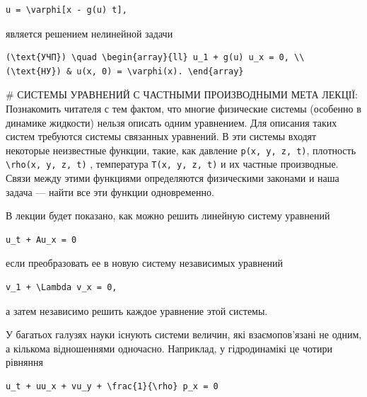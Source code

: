 \documentclass[
  ukrainian,
]{article}
\begin{document}
\begin{verbatim}
u = \varphi[x - g(u) t],
\end{verbatim}

является решением нелинейной задачи

\begin{verbatim}
(\text{УЧП}) \quad \begin{array}{ll} u_1 + g(u) u_x = 0, \\ (\text{НУ}) & u(x, 0) = \varphi(x). \end{array}
\end{verbatim}

\# СИСТЕМЫ УРАВНЕНИЙ С ЧАСТНЫМИ ПРОИЗВОДНЫМИ МЕТА ЛЕКЦІЇ: Познакомить
читателя с тем фактом, что многие физические системы (особенно в
динамике жидкости) нельзя описать одним уравнением. Для описания таких
систем требуются системы связанных уравнений. В эти системы входят
некоторые неизвестные функции, такие, как давление
\texttt{p(x,\ y,\ z,\ t)}, плотность
\texttt{\textbackslash{}rho(x,\ y,\ z,\ t)} , температура
\texttt{T(x,\ y,\ z,\ t)} и их частные производные. Связи между этими
функциями определяются физическими законами и наша задача --- найти все
эти функции одновременно.

В лекции будет показано, как можно решить линейную систему уравнений

\begin{verbatim}
u_t + Au_x = 0
\end{verbatim}

если преобразовать ее в новую систему независимых уравнений

\begin{verbatim}
v_1 + \Lambda v_x = 0,
\end{verbatim}

а затем независимо решить каждое уравнение этой системы.

У багатьох галузях науки існують системи величин, які взаємопов'язані не
одним, а кількома відношеннями одночасно. Наприклад, у гідродинамікі це
чотири рівняння

\begin{verbatim}
u_t + uu_x + vu_y + \frac{1}{\rho} p_x = 0
\end{verbatim}
\end{document}
